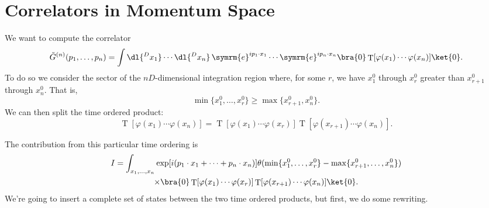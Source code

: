 \documentclass[fleqn]{NotesClass}
\newcommand{\e}{\symrm{e}}
\newcommand{\heaviside}{\theta}
\DeclareMathOperator{\timeOrdering}{T}
\begin{document}
    \section{Correlators in Momentum Space}\label{sec:correlators in momentum space}
    We want to compute the correlator
    \begin{equation*}
        \tilde{G}^{(n)}(p_1, \dotsc, p_n) = \int \dl{^Dx_1} \dotsm \dl{^Dx_n} \, \e^{ip_1\cdot x_1} \dotsm \e^{ip_n\cdot x_n} \bra{0} \timeOrdering[\varphi(x_1) \dotsm \varphi(x_n)] \ket{0}.
    \end{equation*}
    To do so we consider the sector of the \(nD\)-dimensional integration region where, for some \(r\), we have \(x_1^0\) through \(x_r^0\) greater than \(x_{r+1}^0\) through \(x_n^{0}\).
    That is,
    \begin{equation}
        \min\{x_1^0, \dotsc, x_r^0\} \ge \max\{x_{r+1}^0, x_n^0\}.
    \end{equation}
    We can then split the time ordered product:
    \begin{equation}
        \timeOrdering[\varphi(x_1) \dotsm \varphi(x_n)] = \timeOrdering[\varphi(x_1) \dotsm \varphi(x_r)] \timeOrdering[\varphi(x_{r+1}) \dotsm \varphi(x_n)].
    \end{equation}
    
    The contribution from this particular time ordering is
    \begin{multline}\label{eqn:contribution to correlator}
        I = \int_{x_1, \dotsc, x_n} \exp[i(p_1 \cdot x_1 + \dotsb + p_n \cdot x_n)] \heaviside(\min\{x_1^0, \dotsc, x_r^0\} - \max\{x_{r+1}^0, \dotsc, x_n^0\})\\
        \times\bra{0} \timeOrdering[\varphi(x_1) \dotsm \varphi(x_r)] \timeOrdering[\varphi(x_{r+1}) \dotsm \varphi(x_n)] \ket{0}.
    \end{multline}
    We're going to insert a complete set of states between the two time ordered products, but first, we do some rewriting.
    
\end{document}
